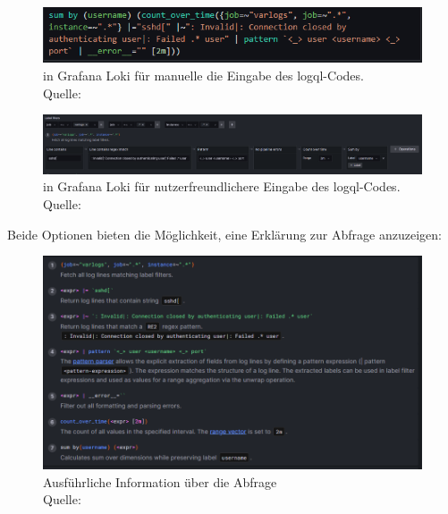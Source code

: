 \begin{figure}[H]
   \centering
   \includegraphics[width=1\textwidth]{assets/manuellerCodeLoki.png}
   \caption[ in Grafana Loki für manuelle die Eingabe des \gls{logql}-Codes]
   { in Grafana Loki für manuelle die Eingabe des \gls{logql}-Codes. \\ Quelle: \citep{VoidQuark_sshlogs}}
   \centering
\end{figure}

\begin{figure}[H]
   \centering
   \includegraphics[width=1\textwidth]{assets/klickibuntyGrafana.png}
   \caption[ in Grafana Loki für nutzerfreundlichere Eingabe des \gls{logql}-Codes.]
   { in Grafana Loki für nutzerfreundlichere Eingabe des \gls{logql}-Codes. Quelle: \citep{VoidQuark_sshlogs}}
   \centering
\end{figure}

Beide Optionen bieten die Möglichkeit, eine Erklärung zur Abfrage anzuzeigen:
\begin{figure}[H]
   \centering
   \includegraphics[width=1\textwidth]{assets/erklaerungLoki.png}
   \caption[Ausführliche Information über die Abfrage]
   {Ausführliche Information über die Abfrage\\Quelle: \citep{Grafana_QueryEditor}}
   \centering
\end{figure}

